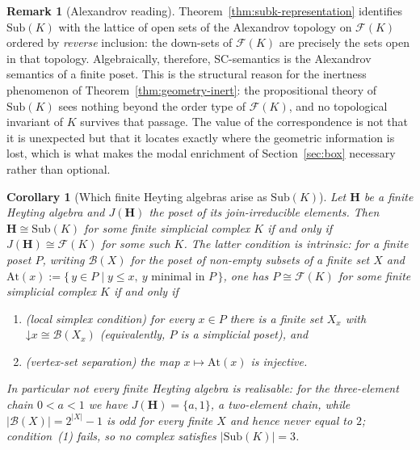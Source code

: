 \documentclass[final,12pt]{elsarticle}
\theoremstyle{plain}
\newtheorem{cor}[thm]{Corollary}
\theoremstyle{definition}
\newtheorem{rem}[thm]{Remark}
\begin{document}
\begin{rem}[Alexandrov reading]
\label{rem:alexandrov}
Theorem~\ref{thm:subk-representation} identifies \(\mathrm{Sub}(K)\) with the
lattice of open sets of the Alexandrov topology on \(\mathcal F(K)\) ordered by
\emph{reverse} inclusion: the down-sets of \(\mathcal F(K)\) are precisely the
sets open in that topology. Algebraically, therefore, SC-semantics is the
Alexandrov semantics of a finite poset. This is the structural reason for the
inertness phenomenon of Theorem~\ref{thm:geometry-inert}: the propositional
theory of \(\mathrm{Sub}(K)\) sees nothing beyond the order type of
\(\mathcal F(K)\), and no topological invariant of \(K\) survives that passage.
The value of the correspondence is not that it is unexpected but that it locates
exactly where the geometric information is lost, which is what makes the modal
enrichment of Section~\ref{sec:box} necessary rather than optional.
\end{rem}

\begin{cor}[Which finite Heyting algebras arise as \texorpdfstring{$\mathrm{Sub}(K)$}{Sub(K)}]
\label{cor:realizable-heyting}
Let \(\mathbf H\) be a finite Heyting algebra and \(J(\mathbf H)\) the poset of
its join-irreducible elements. Then \(\mathbf H \cong \mathrm{Sub}(K)\) for some
finite simplicial complex \(K\) if and only if
\(J(\mathbf H) \cong \mathcal F(K)\) for some such \(K\). The latter condition is
intrinsic: for a finite poset \(P\), writing \(\mathcal B(X)\) for the poset of
non-empty subsets of a finite set \(X\) and
\(\mathrm{At}(x) := \{\, y \in P \mid y \le x,\ y \text{ minimal in } P \,\}\),
one has \(P \cong \mathcal F(K)\) for some finite simplicial complex \(K\) if and
only if
\begin{enumerate}
  \item \emph{(local simplex condition)} for every \(x \in P\) there is a finite
        set \(X_x\) with \(\mathord{\downarrow}x \cong \mathcal B(X_x)\)
        (equivalently, \(P\) is a \emph{simplicial poset}), and
  \item \emph{(vertex-set separation)} the map \(x \mapsto \mathrm{At}(x)\) is
        injective.
\end{enumerate}
In particular not every finite Heyting algebra is realisable: for the
three-element chain \(0 < a < 1\) we have \(J(\mathbf H) = \{a, 1\}\), a
two-element chain, while \(\lvert \mathcal B(X)\rvert = 2^{\lvert X\rvert} - 1\)
is odd for every finite \(X\) and hence never equal to \(2\); condition~(1)
fails, so no complex satisfies \(\lvert\mathrm{Sub}(K)\rvert = 3\).
\end{cor}
\end{document}

